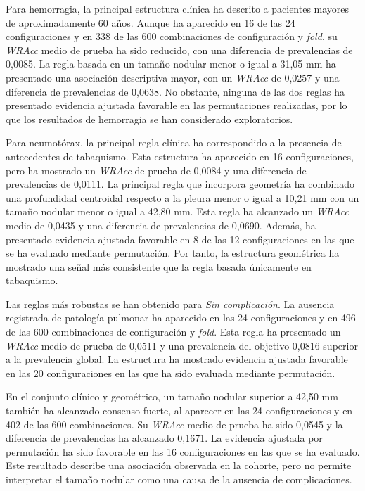 Para hemorragia, la principal estructura clínica ha descrito a pacientes mayores de aproximadamente 60 años. Aunque ha aparecido en 16 de las 24 configuraciones y en 338 de las 600 combinaciones de configuración y \textit{fold}, su \textit{WRAcc} medio de prueba ha sido reducido, con una diferencia de prevalencias de 0,0085. La regla basada en un tamaño nodular menor o igual a 31,05 mm ha presentado una asociación descriptiva mayor, con un \textit{WRAcc} de 0,0257 y una diferencia de prevalencias de 0,0638. No obstante, ninguna de las dos reglas ha presentado evidencia ajustada favorable en las permutaciones realizadas, por lo que los resultados de hemorragia se han considerado exploratorios.

Para neumotórax, la principal regla clínica ha correspondido a la presencia de antecedentes de tabaquismo. Esta estructura ha aparecido en 16 configuraciones, pero ha mostrado un \textit{WRAcc} de prueba de 0,0084 y una diferencia de prevalencias de 0,0111. La principal regla que incorpora geometría ha combinado una profundidad centroidal respecto a la pleura menor o igual a 10,21 mm con un tamaño nodular menor o igual a 42,80 mm. Esta regla ha alcanzado un \textit{WRAcc} medio de 0,0435 y una diferencia de prevalencias de 0,0690. Además, ha presentado evidencia ajustada favorable en 8 de las 12 configuraciones en las que se ha evaluado mediante permutación. Por tanto, la estructura geométrica ha mostrado una señal más consistente que la regla basada únicamente en tabaquismo.

Las reglas más robustas se han obtenido para \textit{Sin complicación}. La ausencia registrada de patología pulmonar ha aparecido en las 24 configuraciones y en 496 de las 600 combinaciones de configuración y \textit{fold}. Esta regla ha presentado un \textit{WRAcc} medio de prueba de 0,0511 y una prevalencia del objetivo 0,0816 superior a la prevalencia global. La estructura ha mostrado evidencia ajustada favorable en las 20 configuraciones en las que ha sido evaluada mediante permutación.

En el conjunto clínico y geométrico, un tamaño nodular superior a 42,50 mm también ha alcanzado consenso fuerte, al aparecer en las 24 configuraciones y en 402 de las 600 combinaciones. Su \textit{WRAcc} medio de prueba ha sido 0,0545 y la diferencia de prevalencias ha alcanzado 0,1671. La evidencia ajustada por permutación ha sido favorable en las 16 configuraciones en las que se ha evaluado. Este resultado describe una asociación observada en la cohorte, pero no permite interpretar el tamaño nodular como una causa de la ausencia de complicaciones.

